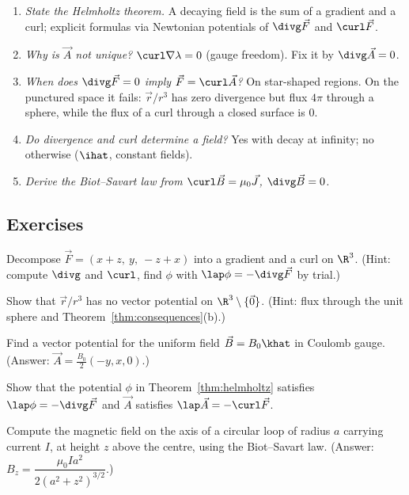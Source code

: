 \begin{interview}
\begin{enumerate}
  \item \emph{State the Helmholtz theorem.} A decaying field is the sum of a gradient and a curl; explicit formulas via Newtonian potentials of $\divg\vec F$ and $\curl\vec F$.
  \item \emph{Why is $\vec A$ not unique?} $\curl\nabla\lambda=0$ (gauge freedom). Fix it by $\divg\vec A=0$.
  \item \emph{When does $\divg\vec F=0$ imply $\vec F=\curl\vec A$?} On star-shaped regions. On the punctured space it fails: $\vec r/r^3$ has zero divergence but flux $4\pi$ through a sphere, while the flux of a curl through a closed surface is $0$.
  \item \emph{Do divergence and curl determine a field?} Yes with decay at infinity; no otherwise ($\ihat$, constant fields).
  \item \emph{Derive the Biot--Savart law from $\curl\vec B=\mu_0\vec J$, $\divg\vec B=0$.}
\end{enumerate}
\end{interview}

\subsection*{Exercises}
\begin{exercise}
Decompose $\vec F=(x+z,\ y,\ -z+x)$ into a gradient and a curl on $\R^3$. (Hint: compute $\divg$ and $\curl$, find $\phi$ with $\lap\phi=-\divg\vec F$ by trial.)
\end{exercise}
\begin{exercise}
Show that $\vec r/r^3$ has no vector potential on $\R^3\setminus\{\vec0\}$. (Hint: flux through the unit sphere and Theorem~\ref{thm:consequences}(b).)
\end{exercise}
\begin{exercise}
Find a vector potential for the uniform field $\vec B=B_0\khat$ in Coulomb gauge. (Answer: $\vec A=\frac{B_0}2(-y,x,0)$.)
\end{exercise}
\begin{exercise}
Show that the potential $\phi$ in Theorem~\ref{thm:helmholtz} satisfies $\lap\phi=-\divg\vec F$ and $\vec A$ satisfies $\lap\vec A=-\curl\vec F$.
\end{exercise}
\begin{exercise}
Compute the magnetic field on the axis of a circular loop of radius $a$ carrying current $I$, at height $z$ above the centre, using the Biot--Savart law. (Answer: $B_z=\dfrac{\mu_0Ia^2}{2(a^2+z^2)^{3/2}}$.)
\end{exercise}
